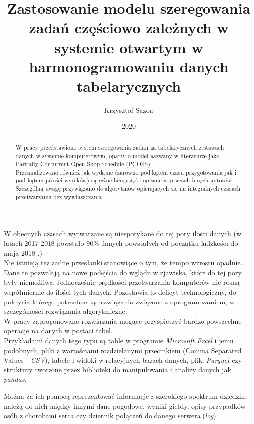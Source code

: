 \documentclass[brudnopis]{xmgr}
\author   {Krzysztof Sazon}
\title    {Zastosowanie modelu szeregowania zadań częściowo zależnych w systemie otwartym w harmonogramowaniu danych tabelarycznych}
\date     {2020}
\begin{document}
\begin{abstract}
W pracy przedstawiono system szeregowania zadań na tabelarycznych zestawach danych w systemie komputerowym, oparty o model nazwany w literaturze jako Partially Concurrent Open Shop Schedule (PCOSS). \\
Przeanalizowano również jak wydajne (zarówno pod kątem czasu przygotowania jak i pod kątem jakości wyników) są różne heurystyki opisane w pracach innych autorów. \\
Szczególną uwagę przywiązano do algorytmów opierających się na integralnych czasach przetwarzania bez wywłaszczania.
\end{abstract}


\maketitle

\introduction

W obecnych czasach wytwarzane są niespotykane do tej pory ilości danych (w latach 2017-2018 powstało 90\% danych powstałych od początku ludzkości do maja 2018 \cite{Forbes:2018:FBS}.) \\
Nie istnieją też żadne przesłanki stanowiące o tym, że tempo wzrostu opadnie.
Dane te pozwalają na nowe podejścia do wglądu w zjawiska, które do tej pory były niemożliwe.
Jednocześnie prędkości przetwarzania komputerów nie rosną współmiernie do ilości tych danych. Pozostawia to deficyt technologiczny, do pokrycia którego potrzebne są rozwiązania związane z oprogramowaniem, w szczególności rozwiązania algorytmiczne.
\medskip\\

W pracy zaproponowano rozwiązania mogące przyspieszyć bardzo powszechne operacje na danych w postaci tabel.
\medskip\\

Przykładami danych tego typu są table w programie \emph{Microsoft Excel} i jemu podobnych, pliki z wartościami rozdzielanymi przecinkiem (Comma Separated Values - \emph{CSV}), tabele i widoki w relacyjnych bazach danych, pliki \emph{Parquet} czy struktury tworzone przez biblioteki do manipulowania i analizy danych jak \emph{pandas}.

Można za ich pomocą reprezentować informacje z szerokiego spektrum dziedzin; należą do nich między innymi dane pogodowe, wyniki giełdy, opisy przypadków osób z chorobami serca czy dziennik połączeń do danego serwera (\emph{log}).
\end{document}
